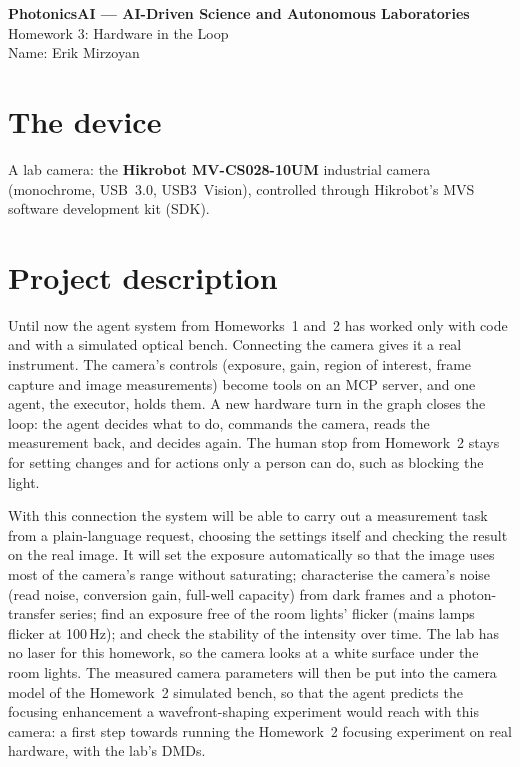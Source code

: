 \documentclass[11pt,a4paper]{article}
\begin{document}
\begin{center}
{\Large\bfseries PhotonicsAI --- AI-Driven Science and Autonomous Laboratories}\\[3pt]
{\large Homework 3: Hardware in the Loop}\\[6pt]
Name: Erik Mirzoyan
\end{center}

\section*{The device}
A lab camera: the \textbf{Hikrobot MV-CS028-10UM} industrial camera (monochrome, USB~3.0, USB3~Vision), controlled
through Hikrobot's MVS software development kit (SDK).

\section*{Project description}
Until now the agent system from Homeworks~1 and~2 has worked only with code and with a simulated optical bench.
Connecting the camera gives it a real instrument. The camera's controls (exposure, gain, region of interest, frame
capture and image measurements) become tools on an MCP server, and one agent, the executor, holds them. A new
hardware turn in the graph closes the loop: the agent decides what to do, commands the camera, reads the measurement back,
and decides again. The human stop from Homework~2 stays for setting changes and for actions only a person can do, such as
blocking the light.

With this connection the system will be able to carry out a measurement task from a plain-language request, choosing the
settings itself and checking the result on the real image. It will set the exposure automatically so that the image uses
most of the camera's range without saturating; characterise the camera's noise (read noise, conversion gain, full-well
capacity) from dark frames and a photon-transfer series; find an exposure free of the room lights' flicker (mains lamps
flicker at 100\,Hz); and check the stability of the intensity over time. The lab has no laser for this homework, so the
camera looks at a white surface under the room lights. The measured camera parameters will then be put into the camera
model of the Homework~2 simulated bench, so that the agent predicts the focusing enhancement a wavefront-shaping experiment
would reach with this camera: a first step towards running the Homework~2 focusing experiment on real hardware, with the
lab's DMDs.
\end{document}
